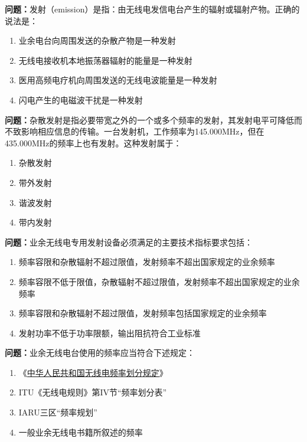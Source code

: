 \textbf{问题：}发射（emission）是指：由无线电发信电台产生的辐射或辐射产物。正确的说法是：
\begin{enumerate}[label=\Alph*), leftmargin=1cm]
	\item 业余电台向周围发送的杂散产物是一种发射
	\item 无线电接收机本地振荡器辐射的能量是一种发射
	\item 医用高频电疗机向周围发送的无线电波能量是一种发射
	\item 闪电产生的电磁波干扰是一种发射
\end{enumerate}

\textbf{问题：}杂散发射是指必要带宽之外的一个或多个频率的发射，其发射电平可降低而不致影响相应信息的传输。一台发射机，工作频率为145.000MHz，但在435.000MHz的频率上也有发射。这种发射属于：
\begin{enumerate}[label=\Alph*), leftmargin=1cm]
	\item 杂散发射
	\item 带外发射
	\item 谐波发射
	\item 带内发射
\end{enumerate}

\textbf{问题：}业余无线电专用发射设备必须满足的主要技术指标要求包括：
\begin{enumerate}[label=\Alph*), leftmargin=1cm]
	\item 频率容限和杂散辐射不超过限值，发射频率不超出国家规定的业余频率
	\item 频率容限不低于限值，杂散辐射不超过限值，发射频率不超出国家规定的业余频率
	\item 频率容限和杂散辐射不超过限值，发射频率包括国家规定的业余频率
	\item 发射功率不低于功率限额，输出阻抗符合工业标准
\end{enumerate}

\textbf{问题：}业余无线电台使用的频率应当符合下述规定：
\begin{enumerate}[label=\Alph*), leftmargin=1cm]
	\item 《\href{https://www.miit.gov.cn/zwgk/zcwj/wjfb/txy/art/2020/art_066386284cd2449493586c81ccafed11.html}{中华人民共和国无线电频率划分规定}》
	\item ITU《无线电规则》第IV节“频率划分表”
	\item IARU三区“频率规划”
	\item 一般业余无线电书籍所叙述的频率
\end{enumerate}

